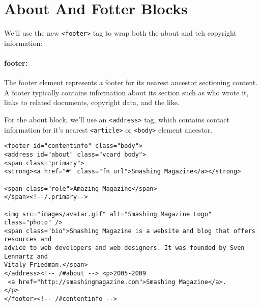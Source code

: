 \documentclass[a4paper, 12pt]{book}
\begin{document}
\section{About And Fotter Blocks}
We'll use the new \verb|<footer>| tag to wrap both the about and teh copyright
information:
\paragraph{footer:} The footer element represents a footer for its nearest
ancestor sectioning content. A footer typically contains information about its
section such as who wrote it, links to related documents, copyright data, and
the like.

For the about block, we'll use an \verb|<address>| tag, which contains contact
information for it's nearest \verb|<article>| or \verb|<body>| element ancestor. 
\begin{verbatim}
<footer id="contentinfo" class="body">
<address id="about" class="vcard body">
<span class="primary">
<strong><a href="#" class="fn url">Smashing Magazine</a></strong>

<span class="role">Amazing Magazine</span>
</span><!--/.primary-->

<img src="images/avatar.gif" alt="Smashing Magazine Logo" class="photo" />
<span class="bio">Smashing Magazine is a website and blog that offers resources and
advice to web developers and web designers. It was founded by Sven Lennartz and
Vitaly Friedman.</span>
</address><!-- /#about --> <p>2005-2009
 <a href="http://smashingmagazine.com">Smashing Magazine</a>.
</p>
</footer><!-- /#contentinfo -->
\end{verbatim}
\end{document}
